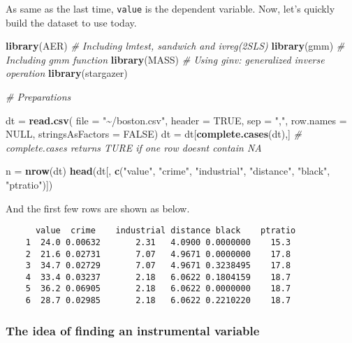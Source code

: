 \documentclass[
  12pt,
]{article}
\newenvironment{Shaded}{\begin{snugshade}}{\end{snugshade}}
\newcommand{\CommentTok}[1]{\textcolor[rgb]{0.56,0.35,0.01}{\textit{#1}}}
\newcommand{\DataTypeTok}[1]{\textcolor[rgb]{0.13,0.29,0.53}{#1}}
\newcommand{\KeywordTok}[1]{\textcolor[rgb]{0.13,0.29,0.53}{\textbf{#1}}}
\newcommand{\NormalTok}[1]{#1}
\newcommand{\OtherTok}[1]{\textcolor[rgb]{0.56,0.35,0.01}{#1}}
\newcommand{\StringTok}[1]{\textcolor[rgb]{0.31,0.60,0.02}{#1}}
\begin{document}
As same as the last time, \texttt{value} is the dependent variable. Now, let's quickly build the dataset to use today.

\begin{Shaded}
\begin{Highlighting}[]
\KeywordTok{library}\NormalTok{(AER) }\CommentTok{\# Including lmtest, sandwich and ivreg(2SLS)}
\KeywordTok{library}\NormalTok{(gmm) }\CommentTok{\# Including gmm function}
\KeywordTok{library}\NormalTok{(MASS) }\CommentTok{\# Using ginv: generalized inverse operation}
\KeywordTok{library}\NormalTok{(stargazer)}

\CommentTok{\# Preparations }

\NormalTok{dt =}\StringTok{ }\KeywordTok{read.csv}\NormalTok{(}
\DataTypeTok{file =} \StringTok{"\textasciitilde{}/boston.csv"}\NormalTok{,}
\DataTypeTok{header =} \OtherTok{TRUE}\NormalTok{, }\DataTypeTok{sep =} \StringTok{","}\NormalTok{, }\DataTypeTok{row.names =} \OtherTok{NULL}\NormalTok{, }\DataTypeTok{stringsAsFactors =} \OtherTok{FALSE}\NormalTok{)}
\NormalTok{dt =}\StringTok{ }\NormalTok{dt[}\KeywordTok{complete.cases}\NormalTok{(dt),] }
\CommentTok{\# complete.cases returns TURE if one row doesn\textquotesingle{}t contain NA}

\NormalTok{n =}\StringTok{ }\KeywordTok{nrow}\NormalTok{(dt)}
\KeywordTok{head}\NormalTok{(dt[, }\KeywordTok{c}\NormalTok{(}\StringTok{"value"}\NormalTok{, }\StringTok{"crime"}\NormalTok{, }\StringTok{"industrial"}\NormalTok{, }\StringTok{"distance"}\NormalTok{, }\StringTok{"black"}\NormalTok{,  }\StringTok{"ptratio"}\NormalTok{)])}
\end{Highlighting}
\end{Shaded}

And the first few rows are shown as below.

\begin{verbatim}
      value  crime    industrial distance black    ptratio
    1  24.0 0.00632       2.31   4.0900 0.0000000    15.3
    2  21.6 0.02731       7.07   4.9671 0.0000000    17.8
    3  34.7 0.02729       7.07   4.9671 0.3238495    17.8
    4  33.4 0.03237       2.18   6.0622 0.1804159    18.7
    5  36.2 0.06905       2.18   6.0622 0.0000000    18.7
    6  28.7 0.02985       2.18   6.0622 0.2210220    18.7
\end{verbatim}

\hypertarget{the-idea-of-finding-an-instrumental-variable}{%
\subsubsection{The idea of finding an instrumental variable}\label{the-idea-of-finding-an-instrumental-variable}}
\end{document}

